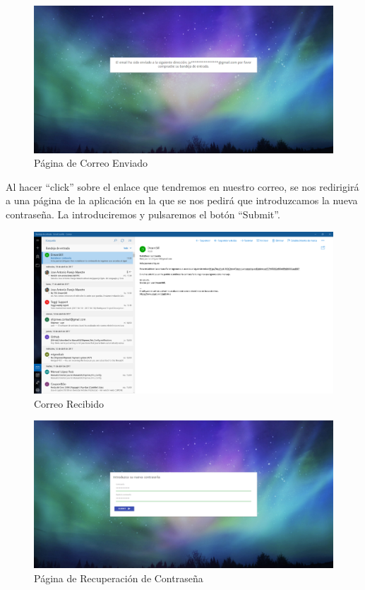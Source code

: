 \documentclass[11pt,openany]{book}
\begin{document}
\begin{figure}[H]
\centering
\includegraphics[totalheight=7cm]{manualUsuario/correoEnviado.png}
\caption{Página de Correo Enviado}
\end{figure}

Al hacer ``click'' sobre el enlace que tendremos en nuestro correo, se nos redirigirá a una página de la aplicación en la que se nos pedirá que introduzcamos la nueva contraseña. La introduciremos y pulsaremos el botón ``Submit''. 

\begin{figure}[H]
\centering
\includegraphics[totalheight=7cm]{manualUsuario/correoRecibido.png}
\caption{Correo Recibido}
\end{figure}

\begin{figure}[H]
\centering
\includegraphics[totalheight=7cm]{manualUsuario/contrase_aRecuperacion.png}
\caption{Página de Recuperación de Contraseña}
\end{figure}
\end{document}
